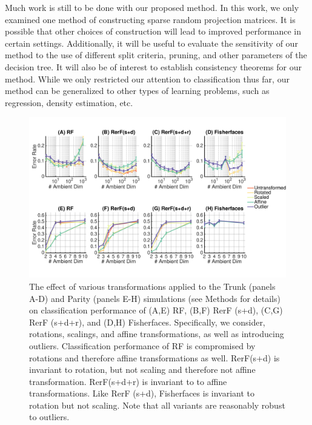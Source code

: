 \documentclass{article} %
\begin{document}
Much work is still to be done with our proposed method. In this work, we only examined one method of constructing sparse random projection matrices. It is possible that other choices of construction will lead to improved performance in certain settings. Additionally, it will be useful to evaluate the sensitivity of our method to the use of different split criteria, pruning, and other parameters of the decision tree. It will also be of interest to establish consistency theorems for our method. While we only restricted our attention to classification thus far, our method can be generalized to other types of learning problems, such as regression, density estimation, etc. 

\begin{figure}[h]
\begin{center}
\includegraphics[trim=0in 0.9in 0in .09in, clip=true, width=\linewidth]{../Figures/pdf/Fig3_Invariance_v2}
\end{center}
\caption{The effect of various transformations applied to the Trunk (panels A-D) and Parity (panels E-H) simulations (see Methods for details) on classification performance of (A,E) RF, (B,F) RerF (s+d), (C,G) RerF (s+d+r), and (D,H) Fisherfaces. Specifically, we consider, rotations, scalings, and affine transformations, as well as introducing outliers. Classification performance of RF is compromised by rotations and therefore affine transformations as well. RerF(s+d) is invariant to rotation, but not scaling and therefore not affine transformation. RerF(s+d+r) is invariant to to affine transformations. Like RerF (s+d), Fisherfaces is invariant to rotation but not scaling. Note that all variants are reasonably robust to outliers.}
\label{fig:invar}
\end{figure}
\end{document}
